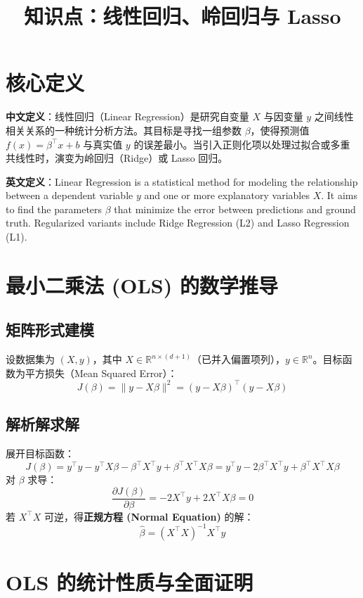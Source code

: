 \documentclass[12pt, a4paper]{article}
\title{知识点：线性回归、岭回归与 Lasso}
\author{}
\date{}
\begin{document}
\maketitle

\section{核心定义}
\textbf{中文定义}：线性回归（Linear Regression）是研究自变量 $X$ 与因变量 $y$ 之间线性相关关系的一种统计分析方法。其目标是寻找一组参数 $\beta$，使得预测值 $f(x) = \beta^\top x + b$ 与真实值 $y$ 的误差最小。当引入正则化项以处理过拟合或多重共线性时，演变为岭回归（Ridge）或 Lasso 回归。

\textbf{英文定义}：Linear Regression is a statistical method for modeling the relationship between a dependent variable $y$ and one or more explanatory variables $X$. It aims to find the parameters $\beta$ that minimize the error between predictions and ground truth. Regularized variants include Ridge Regression (L2) and Lasso Regression (L1).

\section{最小二乘法 (OLS) 的数学推导}

\subsection{矩阵形式建模}
设数据集为 $(X, y)$，其中 $X \in \mathbb{R}^{n \times (d+1)}$（已并入偏置项列），$y \in \mathbb{R}^n$。目标函数为平方损失（Mean Squared Error）：
$$ J(\beta) = \|y - X\beta\|^2 = (y - X\beta)^\top (y - X\beta) $$

\subsection{解析解求解}
展开目标函数：
$$ J(\beta) = y^\top y - y^\top X\beta - \beta^\top X^\top y + \beta^\top X^\top X \beta = y^\top y - 2\beta^\top X^\top y + \beta^\top X^\top X \beta $$
对 $\beta$ 求导：
$$ \frac{\partial J(\beta)}{\partial \beta} = -2X^\top y + 2X^\top X \beta = 0 $$
若 $X^\top X$ 可逆，得\textbf{正规方程 (Normal Equation)} 的解：
$$ \hat{\beta} = (X^\top X)^{-1} X^\top y $$

\section{OLS 的统计性质与全面证明}
\end{document}
